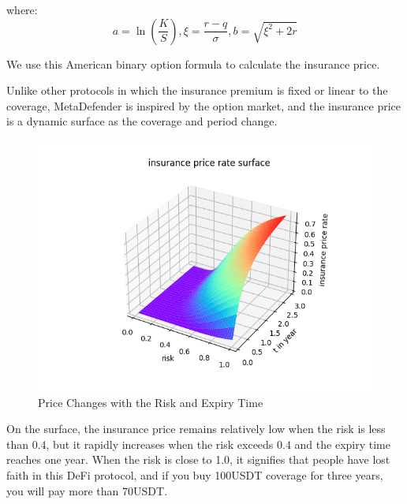 where:
\begin{equation}
	a = \ln(\frac{K}{S}), \xi = \frac{r-q}{\sigma}, b = \sqrt {\xi^2 + 2r}\label{eq:equation5}
\end{equation}

We use this American binary option formula to calculate the insurance price.

Unlike other protocols in which the insurance premium is fixed or linear to the coverage, MetaDefender is inspired by the option market, and the insurance price is a dynamic surface as the coverage and period change.

\begin{figure}[H]
	\includegraphics[width=\linewidth]{./graphs/insurance_price_rate_surface} %
	\caption{Price Changes with the Risk and Expiry Time} %
	\label{fig:surface} %
\end{figure}

On the surface, the insurance price remains relatively low when the risk is less than 0.4, but it rapidly increases when the risk exceeds 0.4 and the expiry time reaches one year.
When the risk is close to 1.0, it signifies that people have lost faith in this DeFi protocol, and if you buy 100USDT coverage for three years, you will pay more than 70USDT.